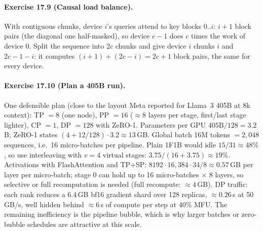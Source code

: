 \paragraph{Exercise 17.9 (Causal load balance).}
With contiguous chunks, device $i$'s queries attend to key blocks $0..i$: $i+1$ block pairs (the
diagonal one half-masked), so device $c-1$ does $c$ times the work of device 0. Split the sequence
into $2c$ chunks and give device $i$ chunks $i$ and $2c-1-i$: it computes $(i+1)+(2c-i)=2c+1$
block pairs, the same for every device.

\paragraph{Exercise 17.10 (Plan a 405B run).}
One defensible plan (close to the layout Meta reported for Llama~3 405B at 8k context): TP $=8$
(one node), PP $=16$ ($\approx8$ layers per stage, first/last stage lighter), CP $=1$, DP $=128$
with ZeRO-1. Parameters per GPU $405\text{B}/128=3.2$B; ZeRO-1 states
$(4+12/128)\cdot3.2\approx13$\,GB. Global batch 16M tokens $=2{,}048$ sequences, i.e.\ 16
micro-batches per pipeline. Plain 1F1B would idle $15/31\approx48\%$, so use interleaving with
$v=4$ virtual stages: $3.75/(16+3.75)\approx19\%$. Activations with FlashAttention and TP+SP:
$8192\cdot16{,}384\cdot34/8\approx0.57$\,GB per layer per micro-batch; stage 0 can hold up to 16
micro-batches $\times$ 8 layers, so selective or full recomputation is needed (full recompute:
$\approx4$\,GB). DP traffic: each rank reduces a 6.4\,GB bf16 gradient shard over 128 replicas,
$\approx0.26$\,s at 50\,GB/s, well hidden behind $\approx6$\,s of compute per step at 40\% MFU. The
remaining inefficiency is the pipeline bubble, which is why larger batches or zero-bubble
schedules are attractive at this scale.
